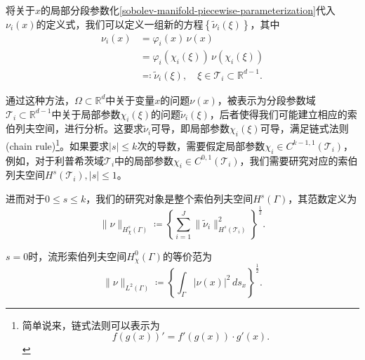 将关于$x$的局部分段参数化\eqref{sobolev-manifold-piecewise-parameterization}代入$\nu_i(x)$的定义式，我们可以定义一组新的方程$\left\{ \widetilde{\nu}_i(\xi) \right\}$，其中
\begin{equation*}
  \begin{split}
    \nu_i(x) &= \varphi_i(x) \, \nu(x) \\
    &= \varphi_i \left( \chi_i(\xi) \right) \, \nu \left( \chi_i(\xi) \right)  \\
    & \eqqcolon \widetilde{\nu}_i(\xi), \quad \xi \in \mathcal{T}_i \subset \mathbb{R}^{d-1}.
  \end{split}
\end{equation*}

通过这种方法，$\Omega \subset \mathbb{R}^{d}$中关于变量$x$的问题$\nu(x)$，被表示为分段参数域$\mathcal{T}_i \subset \mathbb{R}^{d-1}$中关于局部参数$\chi_i(\xi)$的问题$\widetilde{\nu}_i(\xi)$，后者使得我们可能建立相应的索伯列夫空间，进行分析。这要求$\tilde{\nu}_i$可导，即局部参数$\chi_i(\xi)$可导，满足链式法则(chain rule)\footnote{简单说来，链式法则可以表示为
\begin{equation}
  \label{eq:chain-rule-exa}
  f(g(x))' = f'(g(x)) \cdot g'(x).
\end{equation}}。如果要求$\left| s \right| \le k$次的导数，需要假定局部参数$\chi_i \in C^{k-1,1}(\mathcal{T}_i)$，例如，对于利普希茨域$\mathcal{T}_i$中的局部参数$\chi_i \in C^{0,1}(\mathcal{T}_i)$，我们需要研究对应的索伯列夫空间$H^s(\mathcal{T}_i), \left| s \right| \le 1$。

\begin{definition}[流形索伯列夫空间($0 \le s \le k $)]
进而对于$0 \le s \le k$，我们的研究对象是整个索伯列夫空间$H^s(\Gamma)$，其范数定义为
\begin{equation}
  \label{eq:sobolev-manifold-space-def}
  \big\| \nu \big\|_{H_{\chi}^{s}(\Gamma)} \coloneqq \left\{
  \sum_{i=1}^{J} \big\| \widetilde{\nu}_i \big\|_{H^{s}(\mathcal{T}_{i})}^{2}
  \right\}^{\frac{1}{2}}.
\end{equation}
\end{definition}

\begin{lemma}[流形索伯列夫空间的等价范($s=0$)]
$s=0$时，流形索伯列夫空间$H_{\chi}^{0}(\Gamma)$的等价范为
\begin{equation*}
  \| \nu \|_{L^{2}(\Gamma)} \coloneqq \left\{
  \int_{\Gamma} \big| \nu(x) \big|^2 \, d s_x
  \right\} ^{\frac{1}{2}}.
\end{equation*}
\end{lemma}

